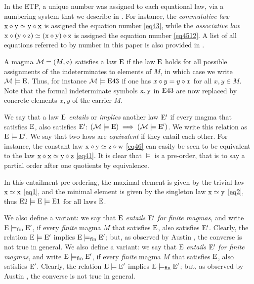 In the ETP, a unique number was assigned to each equational law, via a numbering system that we describe in .  For instance, the \emph{commutative law} $\mathrm{x} \diamond \mathrm{y} \simeq \mathrm{y} \diamond \mathrm{x}$ is assigned the equation number \eqref{eq43}, while the \emph{associative law} $\mathrm{x} \diamond (\mathrm{y} \diamond \mathrm{z}) \simeq (\mathrm{x} \diamond \mathrm{y}) \diamond \mathrm{z}$ is assigned the equation number \eqref{eq4512}.  A list of all equations referred to by number in this paper is also provided in .

A magma ${\mathcal{M}} = (M,\diamond)$ satisfies a law $\mathrm{E}$ if the law $\mathrm{E}$ holds for all possible assignments of the indeterminates to elements of $M$, in which case we write ${\mathcal{M}} \models \mathrm{E}$. Thus, for instance ${\mathcal{M}} \models \mathrm{E}43$ if one has $x \diamond y = y \diamond x$ for all $x,y \in M$.  Note that the formal indeterminate symbols $\mathrm{x}, \mathrm{y}$ in $\mathrm{E}43$ are now replaced by concrete elements $x,y$ of the carrier $M$.

We say that a law $\mathrm{E}$ \emph{entails} or \emph{implies} another law ${\mathrm{E}'}$ if every magma that satisfies $\mathrm{E}$, also satisfies ${\mathrm{E}'}$: $({\mathcal{M}} \models \mathrm{E}) \implies ({\mathcal{M}} \models {\mathrm{E}'})$.  We write this relation as ${\mathrm{E}} \models {\mathrm{E}'}$. We say that two laws are \emph{equivalent} if they entail each other. For instance, the constant law $\mathrm{x} \diamond \mathrm{y} \simeq \mathrm{z} \diamond \mathrm{w}$ \eqref{eq46} can easily be seen to be equivalent to the law $\mathrm{x} \diamond \mathrm{x} \simeq \mathrm{y} \diamond \mathrm{z}$ \eqref{eq41}.  It is clear that $\models$ is a pre-order, that is to say a partial order after one quotients by equivalence.

In this entailment pre-ordering, the maximal element is given by the trivial law $\mathrm{x}\simeq\mathrm{x}$ \eqref{eq1}, and the minimal element is given by the singleton law $\mathrm{x}\simeq \mathrm{y}$ \eqref{eq2}, thus $\mathrm{E}2 \models {\mathrm{E}} \models \mathrm{E}1$ for all laws $\mathrm{E}$.

We also define a variant: we say that $\mathrm{E}$ \emph{entails} ${\mathrm{E}'}$ \emph{for finite magmas}, and write ${\mathrm{E}} \models_{\mathrm{fin}} {\mathrm{E}'}$, if every \emph{finite} magma $M$ that satisfies $\mathrm{E}$, also satisfies ${\mathrm{E}'}$.  Clearly, the relation ${\mathrm{E}} \models {\mathrm{E}'}$ implies ${\mathrm{E}} \models_{\mathrm{fin}} {\mathrm{E}'}$; but, as observed by Austin \cite{austin_finite}, the converse is not true in general.
We also define a variant: we say that $\mathrm{E}$ \emph{entails} ${\mathrm{E}'}$ \emph{for finite magmas}, and write ${\mathrm{E}} \models_{\mathrm{fin}} {\mathrm{E}'}$, if every \emph{finite} magma $M$ that satisfies $\mathrm{E}$, also satisfies ${\mathrm{E}'}$.  Clearly, the relation ${\mathrm{E}} \models {\mathrm{E}'}$ implies ${\mathrm{E}} \models_{\mathrm{fin}} {\mathrm{E}'}$; but, as observed by Austin \cite{austin_finite}, the converse is not true in general.

